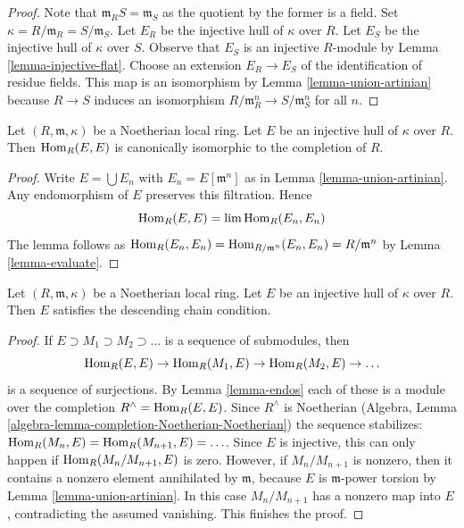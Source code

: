 \begin{proof}
Note that $\mathfrak m_RS = \mathfrak m_S$ as the quotient by the former
is a field. Set $\kappa = R/\mathfrak m_R = S/\mathfrak m_S$.
Let $E_R$ be the injective hull of $\kappa$ over $R$.
Let $E_S$ be the injective hull of $\kappa$ over $S$.
Observe that $E_S$ is an injective $R$-module by
Lemma \ref{lemma-injective-flat}.
Choose an extension $E_R \to E_S$ of the identification of
residue fields. This map is an isomorphism by
Lemma \ref{lemma-union-artinian}
because $R \to S$ induces an isomorphism
$R/\mathfrak m_R^n \to S/\mathfrak m_S^n$ for all $n$.
\end{proof}

\begin{lemma}
\label{lemma-endos}
Let $(R, \mathfrak m, \kappa)$ be a Noetherian local ring.
Let $E$ be an injective hull of $\kappa$ over $R$. Then
$\mathop{\mathrm{Hom}}\nolimits_R(E, E)$ is canonically isomorphic to the completion of $R$.
\end{lemma}

\begin{proof}
Write $E = \bigcup E_n$ with $E_n = E[\mathfrak m^n]$ as in
Lemma \ref{lemma-union-artinian}. Any endomorphism of $E$
preserves this filtration. Hence
$$
\mathop{\mathrm{Hom}}\nolimits_R(E, E) = \mathop{\mathrm{lim}}\nolimits \mathop{\mathrm{Hom}}\nolimits_R(E_n, E_n)
$$
The lemma follows as
$\mathop{\mathrm{Hom}}\nolimits_R(E_n, E_n) = \mathop{\mathrm{Hom}}\nolimits_{R/\mathfrak m^n}(E_n, E_n) = R/\mathfrak m^n$
by Lemma \ref{lemma-evaluate}.
\end{proof}

\begin{lemma}
\label{lemma-injective-hull-has-dcc}
Let $(R, \mathfrak m, \kappa)$ be a Noetherian local ring.
Let $E$ be an injective hull of $\kappa$ over $R$. Then
$E$ satisfies the descending chain condition.
\end{lemma}

\begin{proof}
If $E \supset M_1 \supset M_2 \supset \ldots$ is a sequence of submodules, then
$$
\mathop{\mathrm{Hom}}\nolimits_R(E, E) \to \mathop{\mathrm{Hom}}\nolimits_R(M_1, E) \to \mathop{\mathrm{Hom}}\nolimits_R(M_2, E) \to \ldots
$$
is a sequence of surjections. By Lemma \ref{lemma-endos} each of these is a
module over the completion $R^\wedge = \mathop{\mathrm{Hom}}\nolimits_R(E, E)$.
Since $R^\wedge$ is Noetherian
(Algebra, Lemma \ref{algebra-lemma-completion-Noetherian-Noetherian})
the sequence stabilizes: $\mathop{\mathrm{Hom}}\nolimits_R(M_n, E) = \mathop{\mathrm{Hom}}\nolimits_R(M_{n + 1}, E) = \ldots$.
Since $E$ is injective, this can only happen if $\mathop{\mathrm{Hom}}\nolimits_R(M_n/M_{n + 1}, E)$
is zero. However, if $M_n/M_{n + 1}$ is nonzero, then it contains a
nonzero element annihilated by $\mathfrak m$, because $E$ is
$\mathfrak m$-power torsion by Lemma \ref{lemma-union-artinian}.
In this case $M_n/M_{n + 1}$ has a nonzero map into $E$, contradicting
the assumed vanishing. This finishes the proof.
\end{proof}

